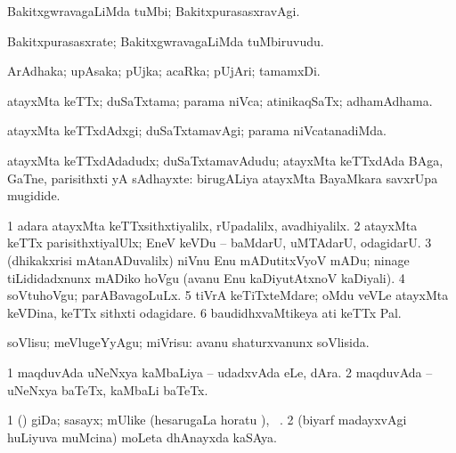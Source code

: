 {{{{{{\begin{center}
{\bentry
{} 
\gl{\kirxvi}
\expl{}
\bmng
BakitxgwravagaLiMda tuMbi; BakitxpurasasxravAgi. 
\emng
\eentry

\bentry
{} 
\gl{\nA}
\expl{}
\bmng
Bakitxpurasasxrate; BakitxgwravagaLiMda tuMbiruvudu. 
\emng
\eentry

\bentry
{} 
\gl{\nA}
\expl{}
\bmng
ArAdhaka; upAsaka; pUjka; acaRka; pUjAri; tamamxDi. 
\emng
\eentry

\bentry 
{} 
\gl{\gu}
\expl{}
\bmng
atayxMta keTTx; duSaTxtama; parama niVca; atinikaqSaTx; adhamAdhama. 
\emng
\eentry

\bentry 
{} 
\gl{\kirxvi}
\expl{}
\bmng
atayxMta keTTxdAdxgi; duSaTxtamavAgi; parama niVcatanadiMda. 
\emng
\eentry

\bentry 
{} 
\gl{\nA}
\expl{}
\bmng
atayxMta keTTxdAdadudx; duSaTxtamavAdudu; atayxMta keTTxdAda BAga, GaTne, parisithxti yA sAdhayxte:  birugALiya atayxMta BayaMkara savxrUpa mugidide. 
\emng

\noindent
\gl{\pagu}
\expl{}
\bmng
\bnum
\num{1}  adara atayxMta keTTxsithxtiyalilx, rUpadalilx, avadhiyalilx. 
\num{2}  atayxMta keTTx parisithxtiyalUlx; EneV keVDu -- baMdarU, uMTAdarU, odagidarU. 
\num{3}  (dhikakxrisi mAtanADuvalilx) niVnu Enu mADutitxVyoV mADu; ninage tiLididadxnunx mADiko hoVgu (avanu Enu kaDiyutAtxnoV kaDiyali). 
\num{4}  soVtuhoVgu; parABavagoLuLx. 
\num{5}  tiVrA keTiTxteMdare; oMdu veVLe atayxMta keVDina, keTTx sithxti odagidare. 
\num{6}  baudidhxvaMtikeya ati keTTx Pal. 
\enum
\emng
\eentry

\bentry 
{} 
\gl{\sakirx}
\expl{}
\bmng
soVlisu; meVlugeYyAgu; miVrisu:  avanu shaturxvanunx soVlisida. 
\emng
\eentry

\bentry
{} 
\gl{\nA}
\expl{}
\bmng
\bnum
\num{1} maqduvAda uNeNxya kaMbaLiya -- udadxvAda eLe, dAra. 
\num{2} maqduvAda -- uNeNxya baTeTx, kaMbaLi baTeTx. 
\enum
\emng
\eentry

\bentry
{} 
\gl{\nA}
\expl{}
\bmng
\bnum
\num{1} (\pArxparx) giDa; sasayx; mUlike (hesarugaLa horatu \viparx), \udA\ . 
\num{2} (biyarf madayxvAgi huLiyuva muMcina) moLeta dhAnayxda kaSAya. 
\enum
\emng
\eentry

}
\end{center}}}}}}}
